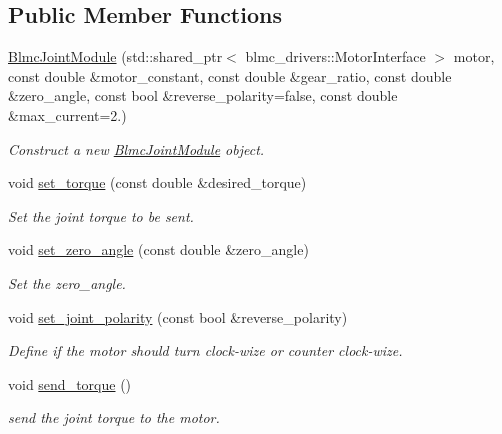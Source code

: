 \subsection*{Public Member Functions}
\begin{DoxyCompactItemize}
\item 
\hyperlink{classblmc__robots_1_1BlmcJointModule_a09a0b8815e6c447e3ee6632ade940e0b}{Blmc\+Joint\+Module} (std\+::shared\+\_\+ptr$<$ blmc\+\_\+drivers\+::\+Motor\+Interface $>$ motor, const double \&motor\+\_\+constant, const double \&gear\+\_\+ratio, const double \&zero\+\_\+angle, const bool \&reverse\+\_\+polarity=false, const double \&max\+\_\+current=2.)
\begin{DoxyCompactList}\small\item\em Construct a new \hyperlink{classblmc__robots_1_1BlmcJointModule}{Blmc\+Joint\+Module} object. \end{DoxyCompactList}\item 
void \hyperlink{classblmc__robots_1_1BlmcJointModule_adeb28005a7160ead68603aed4262508f}{set\+\_\+torque} (const double \&desired\+\_\+torque)
\begin{DoxyCompactList}\small\item\em Set the joint torque to be sent. \end{DoxyCompactList}\item 
void \hyperlink{classblmc__robots_1_1BlmcJointModule_ae59680a947539306e391a12ad2d071bb}{set\+\_\+zero\+\_\+angle} (const double \&zero\+\_\+angle)
\begin{DoxyCompactList}\small\item\em Set the zero\+\_\+angle. \end{DoxyCompactList}\item 
void \hyperlink{classblmc__robots_1_1BlmcJointModule_a137da65771a8628db4692e3bfc924f07}{set\+\_\+joint\+\_\+polarity} (const bool \&reverse\+\_\+polarity)
\begin{DoxyCompactList}\small\item\em Define if the motor should turn clock-\/wize or counter clock-\/wize. \end{DoxyCompactList}\item 
void \hyperlink{classblmc__robots_1_1BlmcJointModule_af0484dd9efc47843706fc71d4351bdbd}{send\+\_\+torque} ()
\begin{DoxyCompactList}\small\item\em send the joint torque to the motor. \end{DoxyCompactList}\item 

\end{DoxyCompactItemize}
